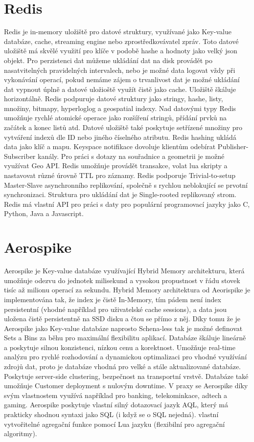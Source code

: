 \documentclass[czech,bachelor,dept460,male,csharp,cpdeclaration]{diploma}
\begin{document}
	\section{Redis}
	
	Redis\cite{redis} je in-memory uložiště pro datové struktury, využívané jako Key-value databáze, cache, streaming engine nebo zprostředkovávatel zpráv. Toto datové uložiště má skvělé využití pro klíče v podobě hashe a hodnoty jako velký json objekt. Pro perzistenci dat můžeme ukládání dat na disk provádět po nasatvitelných pravidelných intervalech, nebo je možné data logovat vždy při vykonávání operací, pokud nemáme zájem o trvanlivost dat je možné ukládání dat vypnout úplně a datové uložioště využít čistě jako cache. Uložiště škáluje horizontálně. Redis podpuruje datové struktury jako stringy, hashe, listy, množiny, bitmapy, hyperloglog a geospatial indexy. Nad datovými typy Redis umožňuje rychlé atomické operace jako rozšíření stringů, přídání prvků na začátek a konec listů atd. Datové uložiště také poskytuje setřízené množiny pro vytváření indexů dle ID nebo jiného číselného atributu. Redis hashing ukládá data jako klíč a mapu. Keyspace notifikace dovoluje klientům odebírat Publisher-Subscriber kanály. Pro práci s dotazy na souřadnice a geometrii je možné využívat Geo API. Redis umožňuje provádět transakce, volat lua skripty a nastavovat různé úrovně TTL pro záznamy. Redis podporuje Trivial-to-setup Master-Slave asynchronního replikování, společně s rychlou neblokující se prvotní synchronizaci. Struktura pro ukládání dat je Single-rooted replikovaný strom. Redis má vlastní API pro práci s daty pro populární programovací jazyky jako C, Python, Java a Javascript.
			
	\section{Aerospike}
	
	Aerospike\cite{aerospike} je Key-value databáze využívající Hybrid Memory architekturu\cite{hybmem-arch}, která umožňuje odezvu do jednotek milisekund a vysokou propustnost v řádu stovek tisíc až milionu operací za sekundu. Hybrid Memory architektura od Aeorispike je implementována tak, že index je čistě In-Memory, tím pádem není index persistentní (vhodné například pro uživatelské cache sessions), a data jsou uložena čistě persistentně na SSD disku a čtou se přímo z něj. Díky tomu že je Aerospike jako Key-value databáze naprosto Schena-less tak je možné definovat Sets a Bins za běhu pro maximální flexibilitu aplikací. Databáze škáluje lineárně a poskytuje silnou konzistenci, nízkou cenu a korektnost. Umožňuje real-time analýzu pro rychlé rozhodování a dynamickou optimalizaci pro vhodné využívání zdrojů dat, proto je databáze vhodná pro velké a stále aktualizované databáze. Poskytuje server-side clustering, bezpečnost na transportní vrstvě. Databáze také umožňuje Customer deployment s nulovým downtime. V praxy se Aerospike díky svým vlastnostem využívá například pro banking, telekominkace, adtech a gaming. Aerospike poskytuje vlastní silný dotazovací jazyk AQL\cite{aql}, který má prakticky shodnou syntaxi jako SQL (i když se o SQL nejedná). vlastní vytvořitelné agregační funkce pomocí Lua jazyku (flexibilní pro agregační algoritmy).
	
\end{document}

